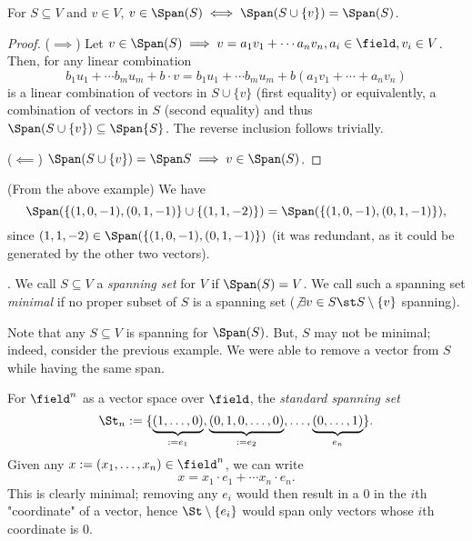 \begin{lemma}
    For $S \subseteq V$ and $v \in V$, $v \in \Span (S) \iff \Span (S \cup \{v\}) = \Span (S)$.
\end{lemma}
\begin{proof}
    ($\implies$) Let $v \in \Span (S) \implies v = a_1 v_1 + \cdots a_n v_n, a_i \in \field, v_i \in V$. Then, for any linear combination \[
    b_1 u_1 + \cdots b_m u_m + b \cdot v  = b_1 u_1 + \cdots b_m u_m + b(a_1 v_1 + \cdots + a_n v_n)   
    \]
    is a linear combination of vectors in $S \cup \{v\}$ (first equality) or equivalently, a combination of vectors in $S$ (second equality) and thus $\Span (S \cup \{v\}) \subseteq \Span{S}$. The reverse inclusion follows trivially.

    ($\impliedby$) $\Span (S \cup \{v\}) = \Span S \implies v \in \Span (S)$.
\end{proof}

\begin{example}
    (From the above example) We have \[
    \Span (\{(1, 0, -1), (0, 1, -1)\} \cup \{(1, 1, -2)\}) = \Span( \{(1, 0, -1), (0, 1, -1) \}),
    \]
    since $(1, 1, -2) \in \Span(\{(1, 0, -1), (0, 1, -1) \})$ (it was redundant, as it could be generated by the other two vectors).
\end{example}

\begin{definition}
     . We call $S \subseteq V$ a \emph{spanning set} for $V$ if $\Span (S) = V$. We call such a spanning set \emph{minimal} if no proper subset of $S$ is a spanning set ($\not \exists v \in S \st S \setminus \{v\}$ spanning).
\end{definition}

\begin{remark}
    Note that any $S \subseteq V$ is spanning for $\Span (S)$. But, $S$ may not be minimal; indeed, consider the previous example. We were able to remove a vector from $S$ while having the same span.
\end{remark}

\begin{example}
    For $\field^n$ as a vector space over $\field$, the \emph{standard spanning set} $$\St_n := \{\underbrace{(1, \dots, 0)}_{:=e_1}, \underbrace{(0, 1, 0, \dots, 0)}_{:=e_2}, \dots, \underbrace{(0, \dots, 1)}_{e_n}\}.$$
    Given any $x := (x_1, \dots, x_n) \in \field^n$, we can write \[
        x = x_1 \cdot e_1 + \cdots x_n \cdot e_n.
    \]
    This is clearly minimal; removing any $e_i$ would then result in a $0$ in the $i$th "coordinate" of a vector, hence $\St \setminus\{e_i\}$ would span only vectors whose $i$th coordinate is $0$.
\end{example}

